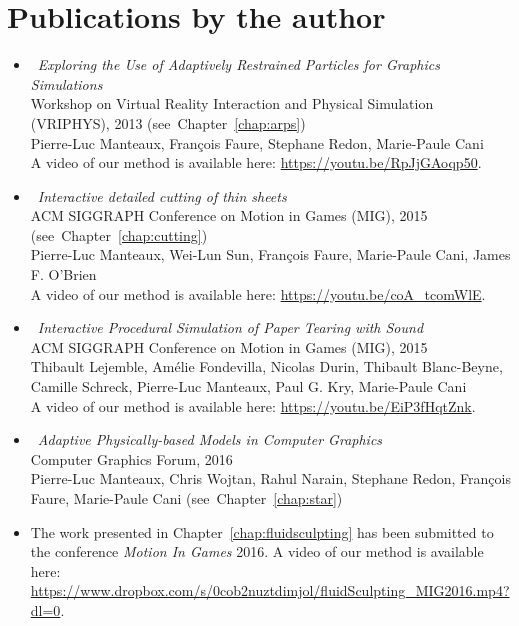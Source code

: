 \section{Publications by the author}
\begin{itemize}
    \item \cite{Manteaux2013}~\emph{Exploring the Use of Adaptively Restrained Particles for Graphics Simulations} \\
    Workshop on Virtual Reality Interaction and Physical Simulation (VRIPHYS), 2013 (see~Chapter~\ref{chap:arps})\\
    Pierre-Luc Manteaux, François Faure, Stephane Redon, Marie-Paule Cani \\
    A video of our method is available here: \url{https://youtu.be/RpJjGAoqp50}.
    \item \cite{Manteaux2015}~\emph{Interactive detailed cutting of thin sheets} \\
        ACM SIGGRAPH Conference on Motion in Games (MIG), 2015 (see~Chapter~\ref{chap:cutting}) \\
        Pierre-Luc Manteaux, Wei-Lun Sun, François Faure, Marie-Paule Cani, James F. O'Brien \\
        A video of our method is available here: \url{https://youtu.be/coA_tcomWlE}.
    \item \cite{Lejemble2015}~\emph{Interactive Procedural Simulation of Paper Tearing with Sound} \\
    ACM SIGGRAPH Conference on Motion in Games (MIG), 2015 \\
    Thibault Lejemble, Amélie Fondevilla, Nicolas Durin, Thibault Blanc-Beyne, Camille Schreck, Pierre-Luc Manteaux, Paul G. Kry, Marie-Paule Cani \\
    A video of our method is available here: \url{https://youtu.be/EiP3fHqtZnk}.
	\item \cite{Manteaux2016}~\emph{Adaptive Physically-based Models in Computer Graphics} \\
    Computer Graphics Forum, 2016 \\
    Pierre-Luc Manteaux, Chris Wojtan, Rahul Narain, Stephane Redon, Fran\c cois Faure, Marie-Paule Cani (see~Chapter~\ref{chap:star})
\item The work presented in Chapter~\ref{chap:fluidsculpting} has been submitted to the conference \emph{Motion In Games} 2016. A video of our method is available here: \url{https://www.dropbox.com/s/0cob2nuztdimjol/fluidSculpting_MIG2016.mp4?dl=0}.
\end{itemize}
